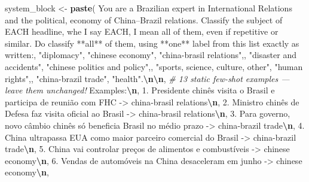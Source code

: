 \documentclass[
  12pt,
]{article}
\newenvironment{Shaded}{\begin{snugshade}}{\end{snugshade}}
\newcommand{\CommentTok}[1]{\textcolor[rgb]{0.56,0.35,0.01}{\textit{#1}}}
\newcommand{\FunctionTok}[1]{\textcolor[rgb]{0.13,0.29,0.53}{\textbf{#1}}}
\newcommand{\NormalTok}[1]{#1}
\newcommand{\OtherTok}[1]{\textcolor[rgb]{0.56,0.35,0.01}{#1}}
\newcommand{\SpecialCharTok}[1]{\textcolor[rgb]{0.81,0.36,0.00}{\textbf{#1}}}
\newcommand{\StringTok}[1]{\textcolor[rgb]{0.31,0.60,0.02}{#1}}
\begin{document}
\begin{Shaded}
\begin{Highlighting}[]
\NormalTok{system\_block }\OtherTok{\textless{}{-}} \FunctionTok{paste}\NormalTok{(}
  \StringTok{\textquotesingle{}You are a Brazilian expert in International Relations and the political\textquotesingle{}}\NormalTok{,}
  \StringTok{\textquotesingle{}economy of China–Brazil relations.  Classify the subject of EACH headline\textquotesingle{}}\NormalTok{,}
  \StringTok{\textquotesingle{}whe I say EACH, I mean all of them, even if repetitive or similar. Do classify **all** of them\textquotesingle{}}\NormalTok{,}
  \StringTok{\textquotesingle{}using **one** label from this list exactly as written:\textquotesingle{}}\NormalTok{,}
  \StringTok{\textquotesingle{}"diplomacy", "chinese economy", "china{-}brasil relations",\textquotesingle{}}\NormalTok{,}
  \StringTok{\textquotesingle{}"disaster and accidents", "chinese politics and policy",\textquotesingle{}}\NormalTok{,}
  \StringTok{\textquotesingle{}"sports, science, culture, other", "human rights",\textquotesingle{}}\NormalTok{,}
  \StringTok{\textquotesingle{}"china{-}brazil trade", "health".}\SpecialCharTok{\textbackslash{}n\textbackslash{}n}\StringTok{\textquotesingle{}}\NormalTok{,}
  \CommentTok{\# 13 static few{-}shot examples — leave them unchanged!}
  \StringTok{\textquotesingle{}Examples:}\SpecialCharTok{\textbackslash{}n}\StringTok{\textquotesingle{}}\NormalTok{,}
  \StringTok{\textquotesingle{}1. Presidente chinês visita o Brasil e participa de reunião com FHC {-}\textgreater{} china{-}brasil relations}\SpecialCharTok{\textbackslash{}n}\StringTok{\textquotesingle{}}\NormalTok{,}
  \StringTok{\textquotesingle{}2. Ministro chinês de Defesa faz visita oficial ao Brasil {-}\textgreater{} china{-}brasil relations}\SpecialCharTok{\textbackslash{}n}\StringTok{\textquotesingle{}}\NormalTok{,}
  \StringTok{\textquotesingle{}3. Para governo, novo câmbio chinês só beneficia Brasil no médio prazo {-}\textgreater{} china{-}brazil trade}\SpecialCharTok{\textbackslash{}n}\StringTok{\textquotesingle{}}\NormalTok{,}
  \StringTok{\textquotesingle{}4. China ultrapassa EUA como maior parceiro comercial do Brasil {-}\textgreater{} china{-}brazil trade}\SpecialCharTok{\textbackslash{}n}\StringTok{\textquotesingle{}}\NormalTok{,}
  \StringTok{\textquotesingle{}5. China vai controlar preços de alimentos e combustíveis {-}\textgreater{} chinese economy}\SpecialCharTok{\textbackslash{}n}\StringTok{\textquotesingle{}}\NormalTok{,}
  \StringTok{\textquotesingle{}6. Vendas de automóveis na China desaceleram em junho {-}\textgreater{} chinese economy}\SpecialCharTok{\textbackslash{}n}\StringTok{\textquotesingle{}}\NormalTok{,}

\end{Highlighting}
\end{Shaded}
\end{document}
